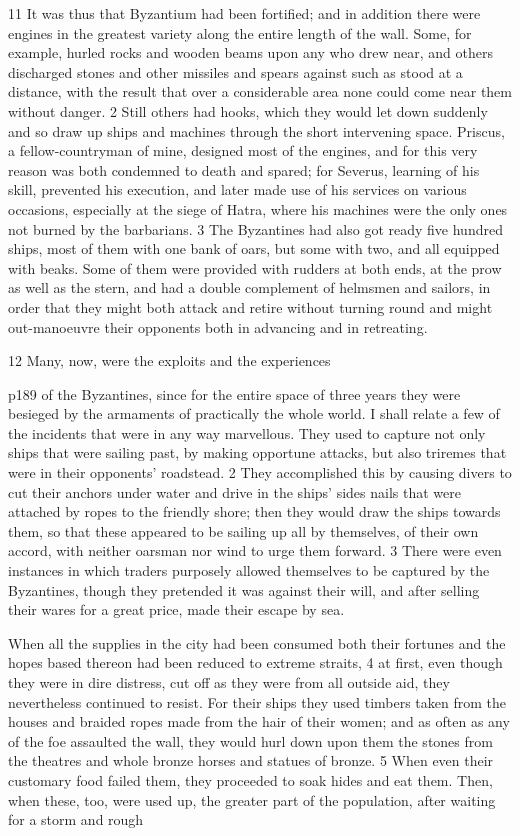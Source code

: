 11
It was thus that Byzantium had been fortified; and in addition there were engines in the greatest variety along the entire length of the wall. Some, for example, hurled rocks and wooden beams upon any who drew near, and others discharged stones and other missiles and spears against such as stood at a distance, with the result that over a considerable area none could come near them without danger. 2 Still others had hooks, which they would let down suddenly and so draw up ships and machines through the short intervening space. Priscus, a fellow-countryman of mine, designed most of the engines, and for this very reason was both condemned to death and spared; for Severus, learning of his skill, prevented his execution, and later made use of his services on various occasions, especially at the siege of Hatra, where his machines were the only ones not burned by the barbarians. 3 The Byzantines had also got ready five hundred ships, most of them with one bank of oars, but some with two, and all equipped with beaks. Some of them were provided with rudders at both ends, at the prow as well as the stern, and had a double complement of helmsmen and sailors, in order that they might both attack and retire without turning round and might out-manoeuvre their opponents both in advancing and in retreating.

12
Many, now, were the exploits and the experiences

p189 of the Byzantines, since for the entire space of three years they were besieged by the armaments of practically the whole world. I shall relate a few of the incidents that were in any way marvellous. They used to capture not only ships that were sailing past, by making opportune attacks, but also triremes that were in their opponents' roadstead. 2 They accomplished this by causing divers to cut their anchors under water and drive in the ships' sides nails that were attached by ropes to the friendly shore; then they would draw the ships towards them, so that these appeared to be sailing up all by themselves, of their own accord, with neither oarsman nor wind to urge them forward. 3 There were even instances in which traders purposely allowed themselves to be captured by the Byzantines, though they pretended it was against their will, and after selling their wares for a great price, made their escape by sea.

When all the supplies in the city had been consumed both their fortunes and the hopes based thereon had been reduced to extreme straits, 4 at first, even though they were in dire distress, cut off as they were from all outside aid, they nevertheless continued to resist. For their ships they used timbers taken from the houses and braided ropes made from the hair of their women; and as often as any of the foe assaulted the wall, they would hurl down upon them the stones from the theatres and whole bronze horses and statues of bronze. 5 When even their customary food failed them, they proceeded to soak hides and eat them. Then, when these, too, were used up, the greater part of the population, after waiting for a storm and rough

